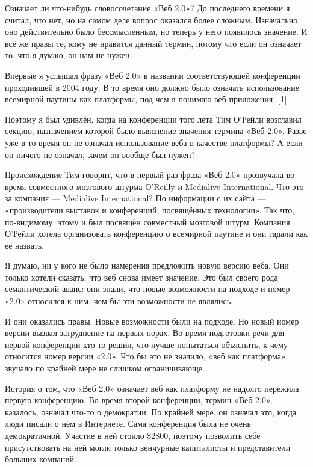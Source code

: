 \documentclass[ebook,12pt,oneside,openany]{memoir}
\begin{document}
\maketitle
Означает ли что-нибудь словосочетание «Веб 2.0»? До последнего времени
я считал, что нет, но на самом деле вопрос оказался более сложным.
Изначально оно действительно было бессмысленным, но теперь у него
появилось значение. И всё же правы те, кому не нравится данный термин,
потому что если он означает то, что я думаю, он нам не нужен.

Впервые я услышал фразу «Веб 2.0» в названии соответствующей
конференции проходившей в 2004 году. В то время оно должно было
означать использование всемирной паутины как платформы, под чем я
понимаю веб-приложения. [1]

Поэтому я был удивлён, когда на конференции того лета Тим О'Рейли
возглавил секцию, назначением которой было выяснение значения термина
«Веб 2.0». Разве уже в то время он не означал использование веба в
качестве платформы? А если он ничего не означал, зачем он вообще был
нужен?

Происхождение Тим говорит, что в первый раз фраза «Веб 2.0» прозвучала
во время совместного мозгового штурма О'Reilly и Medialive
International. Что это за компания — Medialive International? По
информации с их сайта — «производители выставок и конференций,
посвящённых технологии». Так что, по-видимому, этому и был посвящён
совместный мозговой штурм. Компания О'Рейли хотела организовать
конференцию о всемирной паутине и они гадали как её назвать.

Я думаю, ни у кого не было намерения предложить новую версию веба. Они
только хотели сказать, что веб снова имеет значение. Это был своего
рода семантический аванс: они знали, что новые возможности на подходе
и номер «2.0» относился к ним, чем бы эти возможности не являлись.

И они оказались правы. Новые возможности были на подходе. Но новый
номер версии вызвал затруднение на первых порах. Во время подготовки
речи для первой конференции кто-то решил, что лучше попытаться
объяснить, к чему относится номер версии «2.0». Что бы это не значило,
«веб как платформа» звучало по крайней мере не слишком ограничивающе.

История о том, что «Веб 2.0» означает веб как платформу не надолго
пережила первую конференцию. Во время второй конференции, термин «Веб
2.0», казалось, означал что-то о демократии. По крайней мере, он
означал это, когда люди писали о нём в Интернете. Сама конференция
была не очень демократичной. Участие в ней стоило \$2800, поэтому
позволить себе присутствовать на ней могли только венчурные
капиталисты и представители больших компаний.
\end{document}
